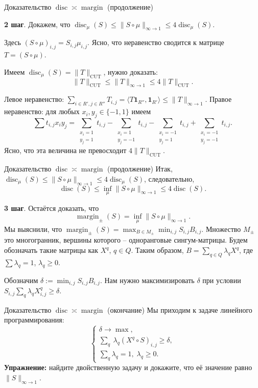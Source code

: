 \documentclass[handout]{beamer}
\renewcommand\le{\leqslant}
\renewcommand\ge{\geqslant}
\DeclareMathOperator{\disc}{disc}
\DeclareMathOperator{\margin}{margin}
\begin{document}
\begin{frame}{Доказательство $\disc\asymp\margin$ (продолжение)}

    \textbf{2 шаг}. Докажем, что $\disc_\mu(S) \le \|S\circ\mu\|_{\infty\to 1}
    \le 4\disc_\mu(S)$.
    \pause

    Здесь $(S\circ\mu)_{i,j} = S_{i,j}\mu_{i,j}$. Ясно, что неравенство сводится
    к матрице $T=(S\circ\mu)$.\pause
    
    Имеем
    $\disc_\mu(S)=\|T\|_{\mathrm{CUT}}$, нужно доказать:
    $$
    \|T\|_{\mathrm{CUT}} \le \|T\|_{\infty\to 1} \le 4\|T\|_{\mathrm{CUT}}.
    $$

    Левое неравенство: $\sum_{i\in R',j\in R''}T_{i,j} = \langle
    T\mathbf{1}_{R''},\mathbf{1}_{R'}\rangle \le \|T\|_{\infty\to 1}$.
    \pause
    Правое неравенство: для любых $x_i,y_j\in\{-1,1\}$ имеем
    $$
    \sum t_{i,j}x_iy_j =
    \sum_{\substack{x_i=1\\y_j=1}} t_{i,j} - 
    \sum_{\substack{x_i=1\\y_j=-1}} t_{i,j} - 
    \sum_{\substack{x_i=-1\\y_j=1}} t_{i,j} + 
    \sum_{\substack{x_i=-1\\y_j=-1}} t_{i,j}.
    $$
    Ясно, что эта величина не превосходит $4\|T\|_{\mathrm{CUT}}$.

\end{frame}
\begin{frame}{Доказательство $\disc\asymp\margin$ (продолжение)}
    Итак, $\disc_\mu(S) \le \|S\circ\mu\|_{\infty\to 1}
    \le 4\disc_\mu(S)$, следовательно,\pause
    $$
    \disc(S) \le \inf_\mu \|S\circ\mu\|_{\infty\to 1} \le 4\disc(S).
    $$
    \pause

    \textbf{3 шаг}. Остаётся доказать, что
    $$
    \margin_\pm(S) = \inf_\mu \|S\circ\mu\|_{\infty\to 1}.
    $$
    \pause
    Мы выяснили, что $\margin_\pm(S) = \max_{B\in M_\pm}
    \min_{i,j}S_{i,j}B_{i,j}$. Множество $M_\pm$ это многогранник, вершины
    которого -- одноранговые сингум-матрицы. Будем обозначать такие матрицы как
    $X^q$, $q\in Q$. Таким образом, $B=\sum_{q\in Q} \lambda_q X^q$, где $\sum
    \lambda_q=1$,
    $\lambda_q\ge 0$.
    \pause\vspace{5pt}

    Обозначим $\delta:=\min_{i,j}S_{i,j}B_{i,j}$. Нам нужно максимизировать
    $\delta$ при условии $S_{i,j} \sum_q \lambda_q X^q_{i,j} \ge \delta$.
\end{frame}

\begin{frame}{Доказательство $\disc\asymp\margin$ (окончание)}
    Мы приходим к задаче линейного программирования:
    $$
    \begin{cases}
        \delta\to\max,\\
        \sum_q\ \lambda_q (X^q\circ S)_{i,j} \ge \delta,\\
        \sum_q \lambda_q = 1,\;\lambda_q \ge 0.
    \end{cases}
    $$
    \pause
    \textbf{Упражнение:} найдите двойственную задачу и докажите, что её значение
    равно $\|S\|_{\infty\to 1}$.
\end{frame}
\end{document}

